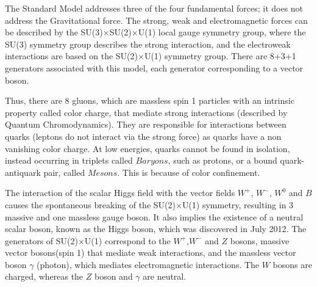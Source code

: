 \documentclass[11pt,a4paper,openright,twoside]{report}
\begin{document}
The Standard Model addresses three of the four fundamental forces; it does not address the Gravitational force. The strong, weak and electromagnetic forces can be described by the SU(3)$\times$SU(2)$\times$U(1) local gauge symmetry group, where the SU(3) symmetry group describes the strong interaction, and the electroweak interactions are based on the SU(2)$\times$U(1) symmetry group. There are 8+3+1 generators associated with this model, each generator corresponding to a vector boson. 

Thus, there are 8 gluons, which are massless spin 1 particles with an intrinsic property called color charge, that mediate strong interactions (described by Quantum Chromodynamics). They are responsible for interactions between quarks (leptons do not interact via the strong force) as quarks have a non vanishing color charge. At low energies, quarks cannot be found in isolation, instead occurring in triplets called $Baryons$, such as protons, or a bound quark-antiquark pair, called $Mesons$. This is because of color confinement\cite{confinement}.

The interaction of the scalar Higgs field with the vector fields $W^+$, $W^-$, $W^0$ and $B$ causes the spontaneous breaking of the SU(2)$\times$U(1) symmetry, resulting in 3 massive and one massless gauge boson. It also implies the existence of a neutral scalar boson, known as the Higgs boson, which was discovered in July 2012\cite{Higgs}. The generators of SU(2)$\times$U(1) correspond to the $W^+$,$W^-$ and $Z$ bosons, massive vector bosons(spin 1) that mediate weak interactions, and the massless vector boson $\gamma$ (photon), which mediates electromagnetic interactions. The $W$ bosons are charged, whereas the $Z$ boson and $\gamma$ are neutral.
\end{document}
